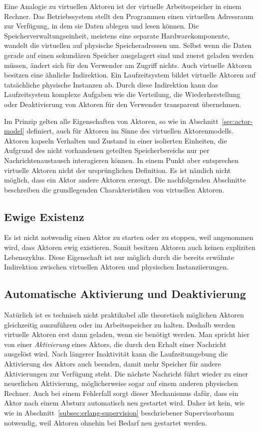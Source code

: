 Eine Analogie zu virtuellen Aktoren ist der virtuelle Arbeitsspeicher in einem Rechner. Das Betriebssystem stellt den Programmen einen virtuellen Adressraum zur Verfügung, in dem sie Daten ablegen und lesen können. Die Speicherverwaltungseinheit, meistens eine separate Hardwarekomponente, wandelt die virtuellen auf physische Speicheradressen um. Selbst wenn die Daten gerade auf einen sekundären Speicher ausgelagert sind und zuerst geladen werden müssen, ändert sich für den Verwender am Zugriff nichts. Auch virtuelle Aktoren besitzen eine ähnliche Indirektion. Ein Laufzeitsystem bildet virtuelle Aktoren auf tatsächliche physische Instanzen ab. Durch diese Indirektion kann das Laufzeitsystem komplexe Aufgaben wie die Verteilung, die Wiederherstellung oder Deaktivierung von Aktoren für den Verwender transparent übernehmen.

Im Prinzip gelten alle Eigenschaften von Aktoren, so wie in Abschnitt~\ref{sec:actor-model} definiert, auch für Aktoren im Sinne des virtuellen Aktorenmodells. \Dah Aktoren kapseln Verhalten und Zustand in einer isolierten Einheiten, die Aufgrund des nicht vorhandenen geteilten Speicherbereichs nur per Nachrichtenaustausch interagieren können. In einem Punkt aber entsprechen virtuelle Aktoren nicht der ursprünglichen Definition. Es ist nämlich nicht möglich, dass ein Aktor andere Aktoren erzeugt. Die nachfolgenden Abschnitte beschreiben die grundlegenden Charakteristiken von virtuellen Aktoren.

\subsection{Ewige Existenz}

Es ist nicht notwendig einen Aktor zu starten oder zu stoppen, weil angenommen wird, dass Aktoren ewig existieren. Somit besitzen Aktoren auch keinen expliziten Lebenszyklus. Diese Eigenschaft ist nur möglich durch die bereits erwähnte Indirektion zwischen virtuellen Aktoren und physischen Instanziierungen.

\subsection{Automatische Aktivierung und Deaktivierung}

Natürlich ist es technisch nicht praktikabel alle theoretisch möglichen Aktoren gleichzeitig auszuführen oder im Arbeitsspeicher zu halten. Deshalb werden virtuelle Aktoren erst dann geladen, wenn sie benötigt werden. Man spricht hier von einer \textit{Aktivierung} eines Aktors, die \zB durch den Erhalt einer Nachricht ausgelöst wird. Nach längerer Inaktivität kann die Laufzeitumgebung die Aktivierung des Aktors auch beenden, damit mehr Speicher für andere Aktivierungen zur Verfügung steht. Die nächste Nachricht führt wieder zu einer neuerlichen Aktivierung, möglicherweise sogar auf einem anderen physischen Rechner. Auch bei einem Fehlerfall sorgt dieser Mechanismus dafür, dass ein Aktor nach einem Absturz automatisch neu gestartet wird. Daher ist kein, wie wie in Abschnitt~\ref{subsec:erlang-supervision} beschriebener Supervisorbaum notwendig, weil Aktoren ohnehin bei Bedarf neu gestartet werden.

